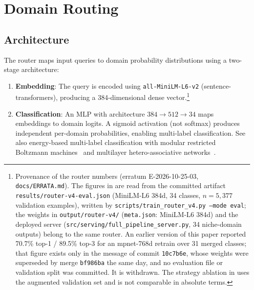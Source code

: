 \documentclass[11pt,a4paper]{article}
\begin{document}
\section{Domain Routing}
\label{sec:routing}

\subsection{Architecture}

The router maps input queries to domain probability distributions using a two-stage architecture:

\begin{enumerate}[nosep]
  \item \textbf{Embedding}: The query is encoded using \texttt{all-MiniLM-L6-v2} (sentence-transformers), producing a 384-dimensional dense vector.\footnote{Provenance of the router numbers (erratum E-2026-10-25-03, \texttt{docs/ERRATA.md}). The figures in  are read from the committed artifact \texttt{results/router-v4-eval.json} (MiniLM-L6 384d, 34 classes, $n = 5{,}377$ validation examples), written by \texttt{scripts/train\_router\_v4.py --mode eval}; the weights in \texttt{output/router-v4/} (\texttt{meta.json}: MiniLM-L6 384d) and the deployed server (\texttt{src/serving/full\_pipeline\_server.py}, 34 niche-domain outputs) belong to the same router. An earlier version of this paper reported 70.7\% top-1 / 89.5\% top-3 for an mpnet-768d retrain over 31 merged classes; that figure exists only in the message of commit \texttt{10c7b6e}, whose weights were superseded by merge \texttt{bf986ba} the same day, and no evaluation file or validation split was committed. It is withdrawn. The strategy ablation in  uses the augmented validation set and is not comparable in absolute terms.}
  \item \textbf{Classification}: An MLP with architecture $384 \rightarrow 512 \rightarrow 34$ maps embeddings to domain logits. A sigmoid activation (not softmax) produces independent per-domain probabilities, enabling multi-label classification. See also energy-based multi-label classification with modular restricted Boltzmann machines~\citep{agliari2026modularrbm} and multilayer hetero-associative networks~\citep{agliari2026heteroexp}.
\end{enumerate}
\end{document}
